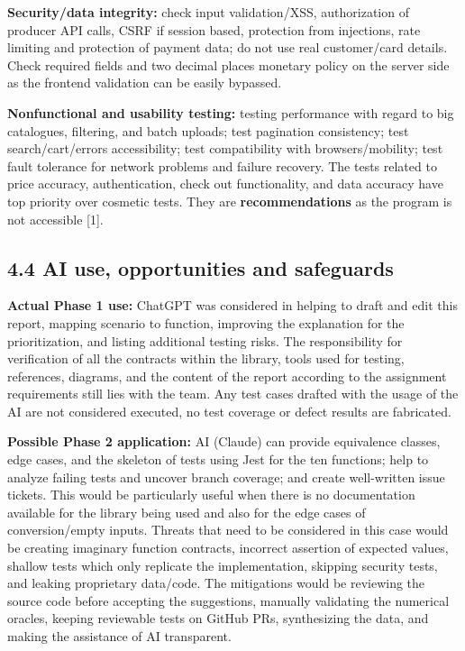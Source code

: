 \documentclass[
  9pt,
]{article}
\begin{document}
\textbf{Security/data integrity:} check input validation/XSS,
authorization of producer API calls, CSRF if session based, protection
from injections, rate limiting and protection of payment data; do not
use real customer/card details. Check required fields and two decimal
places monetary policy on the server side as the frontend validation can
be easily bypassed.

\textbf{Nonfunctional and usability testing:} testing performance with
regard to big catalogues, filtering, and batch uploads; test pagination
consistency; test search/cart/errors accessibility; test compatibility
with browsers/mobility; test fault tolerance for network problems and
failure recovery. The tests related to price accuracy, authentication,
check out functionality, and data accuracy have top priority over
cosmetic tests. They are \textbf{recommendations} as the program is not
accessible {[}1{]}.

\subsection{4.4 AI use, opportunities and
safeguards}\label{ai-use-opportunities-and-safeguards}

\textbf{Actual Phase 1 use:} ChatGPT was considered in helping to draft
and edit this report, mapping scenario to function, improving the
explanation for the prioritization, and listing additional testing
risks. The responsibility for verification of all the contracts within
the library, tools used for testing, references, diagrams, and the
content of the report according to the assignment requirements still
lies with the team. Any test cases drafted with the usage of the AI are
not considered executed, no test coverage or defect results are
fabricated.

\textbf{Possible Phase 2 application:} AI (Claude) can provide
equivalence classes, edge cases, and the skeleton of tests using Jest
for the ten functions; help to analyze failing tests and uncover branch
coverage; and create well-written issue tickets. This would be
particularly useful when there is no documentation available for the
library being used and also for the edge cases of conversion/empty
inputs. Threats that need to be considered in this case would be
creating imaginary function contracts, incorrect assertion of expected
values, shallow tests which only replicate the implementation, skipping
security tests, and leaking proprietary data/code. The mitigations would
be reviewing the source code before accepting the suggestions, manually
validating the numerical oracles, keeping reviewable tests on GitHub
PRs, synthesizing the data, and making the assistance of AI transparent.
\end{document}
